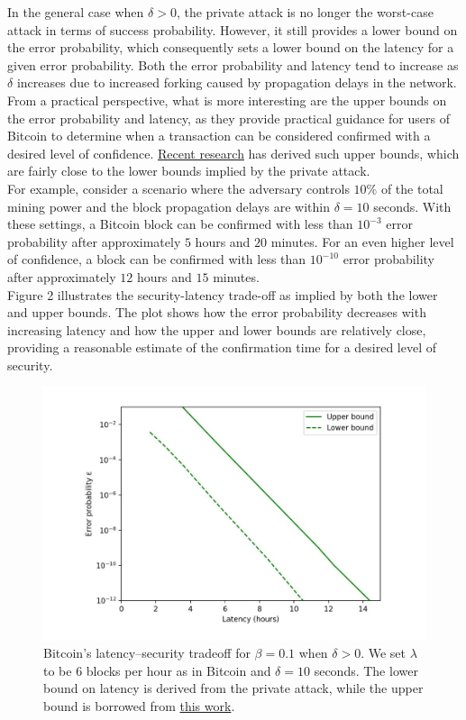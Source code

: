 \documentclass{report}
\begin{document}
In the general case when $\delta > 0$, the private attack is no longer the worst-case attack in terms of success probability. However, it still provides a lower bound on the error probability, which consequently sets a lower bound on the latency for a given error probability. Both the error probability and latency tend to increase as $\delta$ increases due to increased forking caused by propagation delays in the network.\\
From a practical perspective, what is more interesting are the upper bounds on the error probability and latency, as they provide practical guidance for users of Bitcoin to determine when a transaction can be considered confirmed with a desired level of confidence. \href{https://arxiv.org/pdf/2011.14051.pdf}{Recent research} has derived such upper bounds, which are fairly close to the lower bounds implied by the private attack.\\
For example, consider a scenario where the adversary controls $10\%$ of the total mining power and the block propagation delays are within $\delta = 10$ seconds. With these settings, a Bitcoin block can be confirmed with less than $10^{-3}$ error probability after approximately $5$ hours and $20$ minutes. For an even higher level of confidence, a block can be confirmed with less than $10^{-10}$ error probability after approximately $12$ hours and $15$ minutes.\\
Figure 2 illustrates the security-latency trade-off as implied by both the lower and upper bounds. The plot shows how the error probability decreases with increasing latency and how the upper and lower bounds are relatively close, providing a reasonable estimate of the confirmation time for a desired level of security.
\begin{center}
	\begin{figure}
		\centering
		\includegraphics[width=0.8\linewidth]{Fig/F2}
		\caption{Bitcoin’s latency–security tradeoﬀ for $\beta = 0.1$ when $\delta > 0$. We set $\lambda$ to be $6$ blocks per hour as in Bitcoin and $\delta = 10$ seconds. The lower bound on latency is derived from the private attack, while the upper bound is borrowed from \href{https://arxiv.org/pdf/2011.14051.pdf}{this work}.}
		\label{fig:f1}
	\end{figure}
\end{center}
\end{document}
